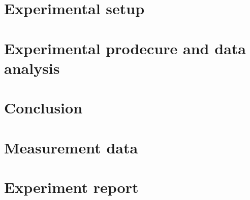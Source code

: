 \documentclass[
    oneside, 
    footinclude=off, 
    captions=tableheading, 
    DIV=12;usenames,
    dvipsnames
]{scrartcl}
\begin{document}
\newpage
\section{Experimental setup}
    

\newpage
\section{Experimental prodecure and data analysis}
    

\newpage
\section{Conclusion}
    


\newpage
    
\newpage
    \listoffigures
    \listoftables


\newpage
    \section*{Measurement data}
    
\newpage
    

\newpage
    \section*{Experiment report}
        
\end{document}
